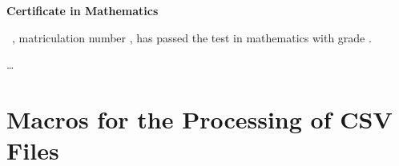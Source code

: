\documentclass[a4paper,11pt]{ltxdoc}
\begin{document}
\begin{dispExample}
%
  {\begin{center}\Large\bfseries Certificate in Mathematics\end{center}
  \large{}
  \firstname~\name, matriculation number \matnumber, has passed the test
  in mathematics with grade \grade.\par\ldots\par
  }%
\end{dispExample}


\clearpage
\section{Macros for the Processing of CSV Files}\label{sec:makros}%
\end{document}
